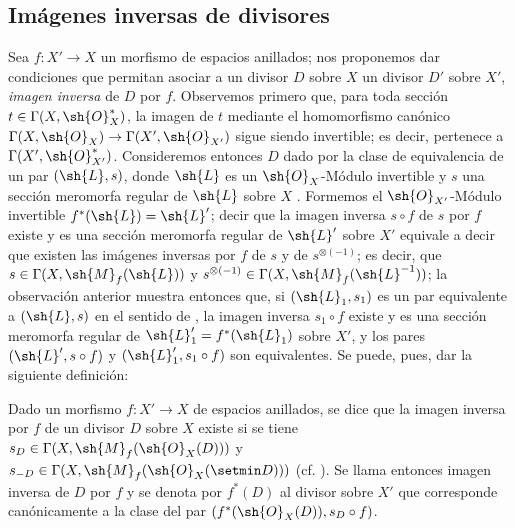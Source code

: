 \subsection{Imágenes inversas de divisores}
\label{subsection:IV.21.4}
\label{IV.21.4}

\begin{env}[21.4.1]
\label{IV.21.4.1}
Sea $f:X'\to X$ un morfismo de espacios anillados;
nos proponemos dar condiciones que permitan asociar a un divisor $D$ sobre $X$ un divisor $D'$ sobre $X'$, \emph{imagen inversa} de $D$ por $f$.
Observemos primero que, para toda sección $t\in\Gamma(X,\sh{O}_X^*)$, la imagen de $t$ mediante el homomorfismo canónico $\Gamma(X,\sh{O}_X)\to\Gamma(X',\sh{O}_{X'})$ sigue siendo invertible; es decir, pertenece a $\Gamma(X',\sh{O}_{X'}^*)$.
Consideremos entonces $D$ dado por la clase de equivalencia de un par $(\sh{L},s)$, donde $\sh{L}$ es un $\sh{O}_X$-Módulo invertible y $s$ una sección meromorfa regular de $\sh{L}$ sobre $X$ .
Formemos el $\sh{O}_{X'}$-Módulo invertible $f^*(\sh{L})=\sh{L}'$;
decir que la imagen inversa $s\circ f$ de $s$ por $f$ existe  y es una sección meromorfa regular de $\sh{L}'$ sobre $X'$ equivale a decir que existen las imágenes inversas por $f$ de $s$ y de $s^{\otimes(-1)}$; es decir, que $s\in\Gamma(X,\sh{M}_f(\sh{L}))$ y $s^{\otimes(-1)}\in\Gamma(X,\sh{M}_f(\sh{L}^{-1}))$;
la observación anterior muestra entonces que, si $(\sh{L}_1,s_1)$ es un par equivalente a $(\sh{L},s)$ en el sentido de , la imagen inversa $s_1\circ f$ existe y es una sección meromorfa regular de $\sh{L}_1'=f^*(\sh{L}_1)$ sobre $X'$, y los pares $(\sh{L}',s\circ f)$ y $(\sh{L}_1',s_1\circ f)$ son equivalentes.
Se puede, pues, dar la siguiente definición:
\end{env}

\begin{definition}[21.4.2]
\label{IV.21.4.2}
Dado un morfismo $f:X'\to X$ de espacios anillados, se dice que la imagen inversa por $f$ de un divisor $D$ sobre $X$ existe si se tiene $s_D\in\Gamma(X,\sh{M}_f(\sh{O}_X(D)))$ y $s_{-D}\in\Gamma(X,\sh{M}_f(\sh{O}_X(\setmin D)))$ \textup{(cf. )}.
Se llama entonces imagen inversa de $D$ por $f$ y se denota por $f^*(D)$ al divisor sobre $X'$ que corresponde canónicamente  a la clase del par $(f^*(\sh{O}_X(D)),s_D\circ f)$.
\end{definition}

